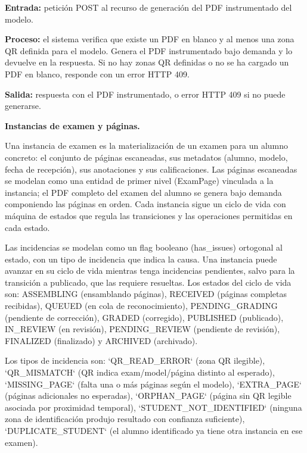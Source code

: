 \begin{functional}
\begin{functional}
    \textbf{Entrada:} petición POST al recurso de generación del PDF instrumentado del modelo.

    \textbf{Proceso:} el sistema verifica que existe un PDF en blanco y al menos una zona QR definida para el modelo. Genera el PDF instrumentado bajo demanda y lo devuelve en la respuesta. Si no hay zonas QR definidas o no se ha cargado un PDF en blanco, responde con un error HTTP 409.

    \textbf{Salida:} respuesta con el PDF instrumentado, o error HTTP 409 si no puede generarse.

  \end{functional}

  \item \textbf{Instancias de examen y páginas.}

  Una instancia de examen es la materialización de un examen para un alumno concreto: el conjunto de páginas escaneadas, sus metadatos (alumno, modelo, fecha de recepción), sus anotaciones y sus calificaciones. Las páginas escaneadas se modelan como una entidad de primer nivel (ExamPage) vinculada a la instancia; el PDF completo del examen del alumno se genera bajo demanda componiendo las páginas en orden. Cada instancia sigue un ciclo de vida con máquina de estados que regula las transiciones y las operaciones permitidas en cada estado.

  Las incidencias se modelan como un flag booleano (has\_issues) ortogonal al estado, con un tipo de incidencia que indica la causa. Una instancia puede avanzar en su ciclo de vida mientras tenga incidencias pendientes, salvo para la transición a publicado, que las requiere resueltas. Los estados del ciclo de vida son: ASSEMBLING (ensamblando páginas), RECEIVED (páginas completas recibidas), QUEUED (en cola de reconocimiento), PENDING\_GRADING (pendiente de corrección), GRADED (corregido), PUBLISHED (publicado), IN\_REVIEW (en revisión), PENDING\_REVIEW (pendiente de revisión), FINALIZED (finalizado) y ARCHIVED (archivado).

  Los tipos de incidencia son: `QR\_READ\_ERROR` (zona QR ilegible), `QR\_MISMATCH` (QR indica exam/model/página distinto al esperado), `MISSING\_PAGE` (falta una o más páginas según el modelo), `EXTRA\_PAGE` (páginas adicionales no esperadas), `ORPHAN\_PAGE` (página sin QR legible asociada por proximidad temporal), `STUDENT\_NOT\_IDENTIFIED` (ninguna zona de identificación produjo resultado con confianza suficiente), `DUPLICATE\_STUDENT` (el alumno identificado ya tiene otra instancia en ese examen).


\end{functional}
